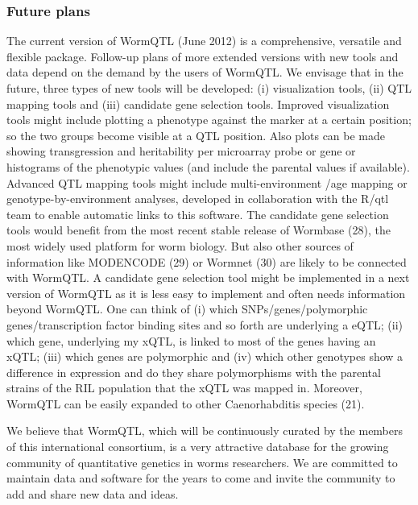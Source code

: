 \subsubsection{Future plans}
The current version of WormQTL (June 2012) is a comprehensive, versatile and flexible package. 
Follow-up plans of more extended versions with new tools and data depend on the demand by the 
users of WormQTL. We envisage that in the future, three types of new tools will be developed: 
(i) visualization tools, (ii) QTL mapping tools and (iii) candidate gene selection tools. Improved 
visualization tools might include plotting a phenotype against the marker at a certain position; 
so the two groups become visible at a QTL position. Also plots can be made showing transgression 
and heritability per microarray probe or gene or histograms of the phenotypic values (and include 
the parental values if available). Advanced QTL mapping tools might include multi-environment
/age mapping or genotype-by-environment analyses, developed in collaboration with the R/qtl team 
to enable automatic links to this software. The candidate gene selection tools would benefit from 
the most recent stable release of Wormbase (28), the most widely used platform for worm biology. 
But also other sources of information like MODENCODE (29) or Wormnet (30) are likely to 
be connected with WormQTL. A candidate gene selection tool might be implemented in a next version 
of WormQTL as it is less easy to implement and often needs information beyond WormQTL. One can 
think of (i) which SNPs/genes/polymorphic genes/transcription factor binding sites and so forth 
are underlying a eQTL; (ii) which gene, underlying my xQTL, is linked to most of the genes 
having an xQTL; (iii) which genes are polymorphic and (iv) which other genotypes show a difference 
in expression and do they share polymorphisms with the parental strains of the RIL population 
that the xQTL was mapped in. Moreover, WormQTL can be easily expanded to other Caenorhabditis 
species (21).

We believe that WormQTL, which will be continuously curated by the members of this international 
consortium, is a very attractive database for the growing community of quantitative genetics in 
worms researchers. We are committed to maintain data and software for the years to come and invite 
the community to add and share new data and ideas.

